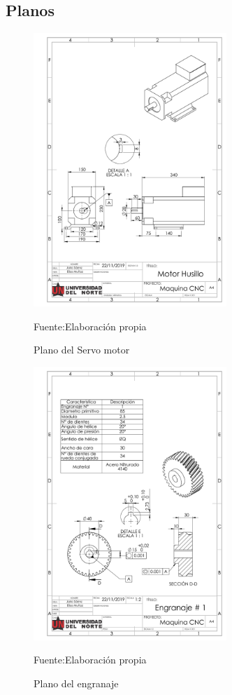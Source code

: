 \subsection{Planos}
\begin{figure}[ht]
    \centering
    \includegraphics[width =0.65\textwidth]{Cap5_DisenoDetallado/Figuras/motor_electrico.PDF}
    \caption{Plano del Servo motor}{Fuente:Elaboración propia}
    \label{fig:Motor_servo}
\end{figure}

\begin{figure}[ht]
    \centering
    \includegraphics[width =0.65\textwidth]{Cap5_DisenoDetallado/Figuras/engranaje_1.PDF}
    \caption{Plano del engranaje}{Fuente:Elaboración propia}
    \label{fig:Planos_engranaje}
\end{figure}


